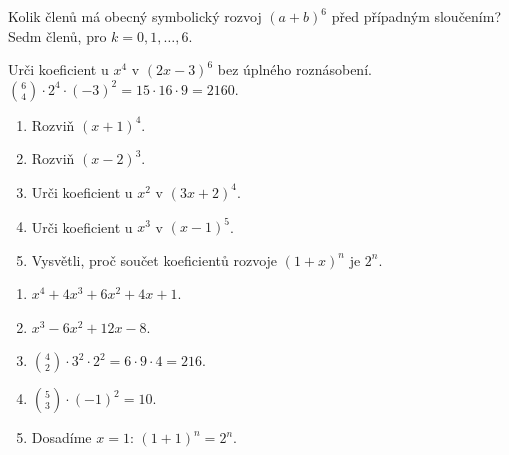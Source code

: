 \documentclass[11pt,a4paper]{article}
\begin{document}
\begin{zadaniReseniBox}[title={Samostatná práce 3}]
Kolik členů má obecný symbolický rozvoj $(a+b)^6$ před případným sloučením?
\tcblower
Sedm členů, pro $k=0,1,\ldots,6$.
\end{zadaniReseniBox}




\begin{zadaniReseniBox}[title={Rozšíření 1}]
Urči koeficient u $x^4$ v $(2x-3)^6$ bez úplného roznásobení.
\tcblower
$\binom64\cdot2^4\cdot(-3)^2=15\cdot16\cdot9=2160$.
\end{zadaniReseniBox}





\begin{zadaniReseniBox}[title={Domácí úkol}]

\begin{enumerate}[label=\alph*),leftmargin=*,itemsep=2pt]

\item Rozviň $(x+1)^4$.
\item Rozviň $(x-2)^3$.
\item Urči koeficient u $x^2$ v $(3x+2)^4$.
\item Urči koeficient u $x^3$ v $(x-1)^5$.
\item Vysvětli, proč součet koeficientů rozvoje $(1+x)^n$ je $2^n$.

\end{enumerate}

\tcblower

\begin{enumerate}[label=\alph*),leftmargin=*,itemsep=2pt]

\item $x^4+4x^3+6x^2+4x+1$.
\item $x^3-6x^2+12x-8$.
\item $\binom42\cdot3^2\cdot2^2=6\cdot9\cdot4=216$.
\item $\binom53\cdot(-1)^2=10$.
\item Dosadíme $x=1$: $(1+1)^n=2^n$.

\end{enumerate}

\end{zadaniReseniBox}

\end{document}
